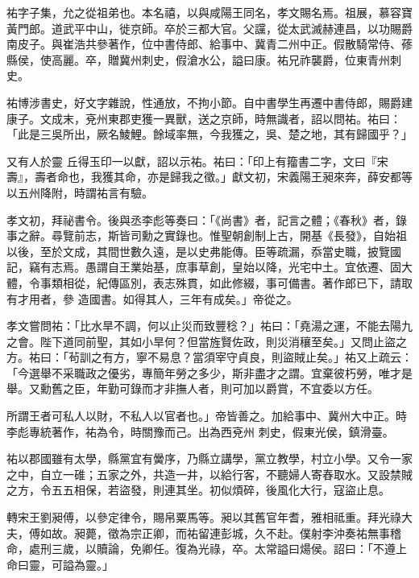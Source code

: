 \begin{pinyinscope}
 祐字子集，允之從祖弟也。本名禧，以與咸陽王同名，孝文賜名焉。祖展，慕容寶黃門郎。道武平中山，徙京師。卒於三都大官。父讜，從太武滅赫連昌，以功賜爵南皮子。與崔浩共參著作，位中書侍郎、給事中、冀青二州中正。假散騎常侍、蓚縣侯，使高麗。卒，贈冀州刺史，假滄水公，謚曰康。祐兄祚襲爵，位東青州刺史。



 祐博涉書史，好文字雜說，性通放，不拘小節。自中書學生再遷中書侍郎，賜爵建康子。文成末，兗州東郡吏獲一異獸，送之京師，時無識者，詔以問祐。祐曰：「此是三吳所出，厥名鯪鯉。餘域率無，今我獲之，吳、楚之地，其有歸國乎？」



 又有人於靈
 丘得玉印一以獻，詔以示祐。祐曰：「印上有籀書二字，文曰『宋壽』，壽者命也，我獲其命，亦是歸我之徵。」獻文初，宋義陽王昶來奔，薛安都等以五州降附，時謂祐言有驗。



 孝文初，拜祕書令。後與丞李彪等奏曰：「《尚書》者，記言之體；《春秋》者，錄事之辭。尋覽前志，斯皆司勳之實錄也。惟聖朝創制上古，開基《長發》，自始祖以後，至於文成，其間世數久遠，是以史弗能傳。臣等疏漏，忝當史職，披覽國記，竊有志焉。愚謂自王業始基，庶事草創，皇始以降，光宅中土。宜依遷、固大體，令事類相從，紀傳區別，表志殊貫，如此修綴，事可備書。著作郎已下，請取有才用者，參
 造國書。如得其人，三年有成矣。」帝從之。



 孝文嘗問祐：「比水旱不調，何以止災而致豐稔？」祐曰：「堯湯之運，不能去陽九之會。陛下道同前聖，其如小旱何？但當旌賢佐政，則災消穰至矣。」又問止盜之方。祐曰：「茍訓之有方，寧不易息？當須宰守貞良，則盜賊止矣。」祐又上疏云：「今選舉不采職政之優劣，專簡年勞之多少，斯非盡才之謂。宜棄彼朽勞，唯才是舉。又勳舊之臣，年勤可錄而才非撫人者，則可加以爵賞，不宜委以方任。



 所謂王者可私人以財，不私人以官者也。」帝皆善之。加給事中、冀州大中正。時李彪專統著作，祐為令，時關豫而己。出為西兗州
 刺史，假東光侯，鎮滑臺。



 祐以郡國雖有太學，縣黨宜有黌序，乃縣立講學，黨立教學，村立小學。又令一家之中，自立一碓；五家之外，共造一井，以給行客，不聽婦人寄舂取水。又設禁賊之方，令五五相保，若盜發，則連其坐。初似煩碎，後風化大行，寇盜止息。



 轉宋王劉昶傅，以參定律令，賜帛粟馬等。昶以其舊官年耆，雅相祗重。拜光祿大夫，傅如故。昶薨，徵為宗正卿，而祐留連彭城，久不赴。僕射李沖奏祐無事稽命，處刑三歲，以贖論，免卿任。復為光祿，卒。太常謚曰煬侯。詔曰：「不遵上命曰靈，可謚為靈。」




\end{pinyinscope}
